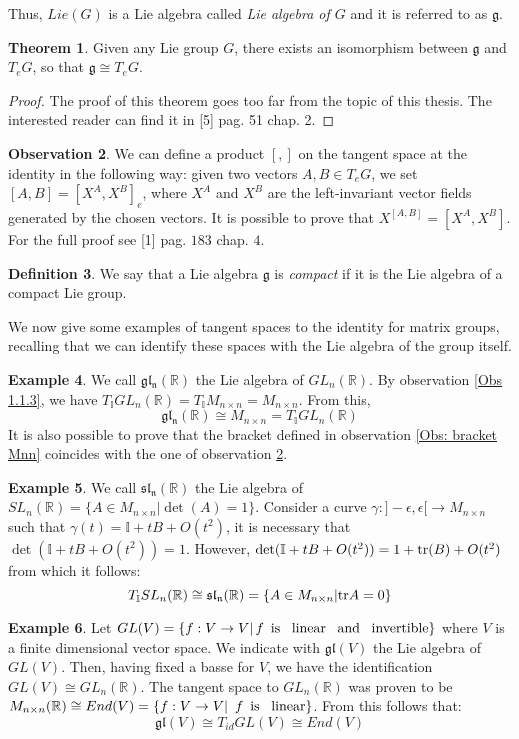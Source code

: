 \documentclass[12pt,a4paper]{report}
\theoremstyle{definition}
\newtheorem{Def}{Definition}[chapter]
\theoremstyle{Theorem}
\newtheorem{Theo}[Def]{Theorem}
\theoremstyle{definition}
\newtheorem{Ex}[Def]{Example}
\theoremstyle{definition}
\newtheorem{Obs}[Def]{Observation}
\begin{document}
	Thus, $Lie(G)$ is a Lie algebra called \textit{Lie algebra of $G$} and it is referred to as $\mathfrak{g}$.
	\begin{Theo}
		Given any Lie group $G$, there exists an isomorphism between $\mathfrak{g}$ and $T_eG$, so that $\mathfrak{g}\cong T_eG$.
	\end{Theo}
	\begin{proof}
		The proof of this theorem goes too far from the topic of this thesis. The interested reader can find it in [5] pag. 51 chap. 2.
	\end{proof}
	\begin{Obs}\label{Obs: bracket T}
		We can define a product $[,]$ on the tangent space at the identity in the following way: given two vectors $A,B\in T_eG$, we set $[A,B]=[X^A,X^B]_e$, where $X^A$ and $X^B$ are the left-invariant vector fields generated by the chosen vectors. It is possible to prove that $X^{[A,B]}=[X^A,X^B]$. 
		For the full proof see [1] pag. $183$ chap. $4$.
	\end{Obs}
	\begin{Def}
		We say that a Lie algebra $\mathfrak{g}$ is \textit{compact} if it is the Lie algebra of a compact Lie group.
	\end{Def}
	We now give some examples of tangent spaces to the identity for matrix groups, recalling that we can identify these spaces with the Lie algebra of the group itself.
	\begin{Ex}
		We call $\mathfrak{gl_n(\mathbb{R})}$ the Lie algebra of $GL_n(\mathbb{R})$.
		By observation \ref{Obs 1.1.3}, we have $T_\mathbb{I}GL_n(\mathbb{R})=T_\mathbb{I}M_{n\times n}=M_{n\times n}$. From this, $$\mathfrak{gl_n(\mathbb{R})}\cong M_{n\times n}= T_\mathbb{I}GL_n(\mathbb{R})$$
		It is also possible to prove that the bracket defined in observation \ref{Obs: bracket Mnn} coincides with the one of observation \ref{Obs: bracket T}.
	\end{Ex}
	\begin{Ex}
		We call $\mathfrak{sl_n(\mathbb{R})}$ the Lie algebra of $SL_n(\mathbb{R})=\{A\in M_{n\times n}|\det(A)=1\}$.
		Consider a curve $\gamma:]-\epsilon,\epsilon[\rightarrow M_{n\times n}$ such that $\gamma(t)=\mathbb{I}+tB+O(t^2)$, it is necessary that $\det(\mathbb{I}+tB+O(t^2))=1$. However, $\det(\mathbb{I}+tB+O(t^2))=1+\hbox{tr}(B)+O(t^2)$ from which it follows: $$T_\mathbb{I}SL_n(\mathbb{R})\cong \mathfrak{sl_n(\mathbb{R})}=\{A\in M_{n\times n}|\hbox{tr}A=0\}$$ 
	\end{Ex}
	\begin{Ex}
		Let $GL(V)=\{f:V\rightarrow V|\, \textnormal{$f$\,  is \, linear \, and \, invertible}\}$ where $V$ is a finite dimensional vector space. We indicate with $\mathfrak{gl}(V)$ the Lie algebra of $GL(V)$.  Then, having fixed a basse for $V$, we have the identification $GL(V)\cong GL_n(\mathbb{R})$. The tangent space to $GL_n(\mathbb{R})$ was proven to be $M_{n\times n}(\mathbb{R})\cong End(V)=\{f:V\rightarrow V|\textnormal{\, $f$\, is \, linear}\}$. From this follows that: 
		$$\mathfrak{gl}(V)\cong T_{id}GL(V)\cong End(V)$$ 
	\end{Ex}
\end{document}
